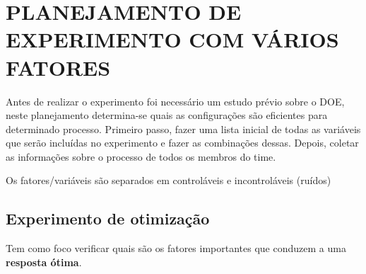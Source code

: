 \chapter{PLANEJAMENTO DE EXPERIMENTO COM VÁRIOS FATORES}
\label{chap:estudo}

Antes de realizar o experimento foi necessário um estudo prévio sobre o \ac{DOE}, neste planejamento determina-se quais as configurações são eficientes para determinado processo.
Primeiro passo, fazer uma lista inicial de todas as variáveis que serão incluídas no experimento e fazer as combinações dessas. Depois, coletar as informações sobre o processo de todos os membros do time. 

Os fatores/variáveis são separados em controláveis e incontroláveis (ruídos)

\section{Experimento de otimização}
Tem como foco verificar quais são os fatores importantes que conduzem a uma \textbf{resposta ótima}. 